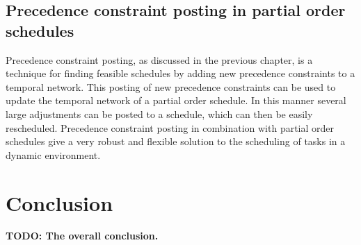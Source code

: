 \documentclass{article}
\newcommand{\TODO}[1]{{\color{red}\textbf{TODO: #1}}}
\begin{document}
\subsection{Precedence constraint posting in partial order schedules}
Precedence constraint posting, as discussed in the previous chapter, is a technique for finding feasible schedules by adding new precedence constraints to a temporal network.
This posting of new precedence constraints can be used to update the temporal network of a partial order schedule.
In this manner several large adjustments can be posted to a schedule, which can then be easily rescheduled.
Precedence constraint posting in combination with partial order schedules give a very robust and flexible solution to the scheduling of tasks in a dynamic environment.

\newpage

\section{Conclusion}
\TODO{The overall conclusion.}

\newpage


\end{document}
